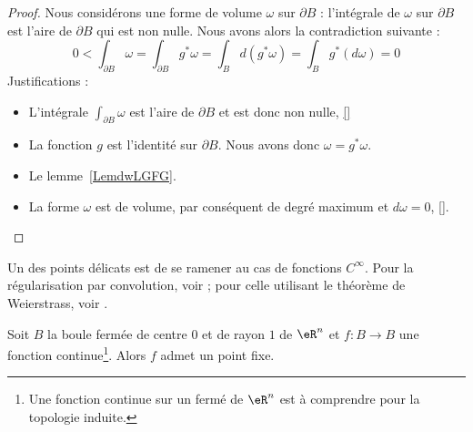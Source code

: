 \begin{proof}
    Nous considérons une forme de volume \( \omega\) sur \( \partial B\) : l'intégrale de \( \omega\) sur \( \partial B\) est l'aire de \( \partial B\) qui est non nulle. Nous avons alors la contradiction suivante : 
    \begin{equation}
        0<\int_{\partial B}\omega
        =\int_{\partial B}g^*\omega
        =\int_Bd(g^*\omega)
        =\int_Bg^*(d\omega)
        =0
    \end{equation}
    Justifications :
    \begin{itemize}
        \item
            L'intégrale \( \int_{\partial B}\omega\) est l'aire de \( \partial B\) et est donc non nulle, \ref{}
        \item
            La fonction \( g\) est l'identité sur \( \partial B\). Nous avons donc \( \omega=g^*\omega\).
        \item
            Le lemme~\ref{LemdwLGFG}.
        \item
            La forme \( \omega\) est de volume, par conséquent de degré maximum et \( d\omega=0\), \ref{}.
    \end{itemize}
\end{proof}

Un des points délicats est de se ramener au cas de fonctions \( C^{\infty}\). Pour la régularisation par convolution, voir \cite{AllardBrouwer}; pour celle utilisant le théorème de Weierstrass, voir \cite{KuttlerTopInAl}.
\begin{theorem}\label{ThoRGjGdO}
    Soit \( B\) la boule fermée de centre \( 0\) et de rayon \( 1\) de \( \eR^n\) et \( f\colon B\to B\) une fonction continue\footnote{Une fonction continue sur un fermé de \( \eR^n\) est à comprendre pour la topologie induite.}. Alors \( f\) admet un point fixe.
\end{theorem}

